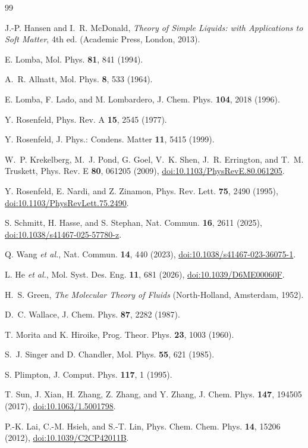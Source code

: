 \documentclass[aps,pre,twocolumn,superscriptaddress,floatfix]{revtex4-2}
\begin{document}
\begin{thebibliography}{99}

J.-P. Hansen and I.~R. McDonald,
\textit{Theory of Simple Liquids: with Applications to Soft Matter}, 4th ed.
(Academic Press, London, 2013).

E. Lomba,
Mol. Phys. \textbf{81}, 841 (1994).

A.~R. Allnatt,
Mol. Phys. \textbf{8}, 533 (1964).

E. Lomba, F. Lado, and M. Lombardero,
J. Chem. Phys. \textbf{104}, 2018 (1996).

Y. Rosenfeld,
Phys. Rev. A \textbf{15}, 2545 (1977).

Y. Rosenfeld,
J. Phys.: Condens. Matter \textbf{11}, 5415 (1999).

W.~P. Krekelberg, M.~J. Pond, G. Goel, V.~K. Shen, J.~R. Errington, and T.~M. Truskett,
Phys. Rev. E \textbf{80}, 061205 (2009),
\href{https://doi.org/10.1103/PhysRevE.80.061205}{doi:10.1103/PhysRevE.80.061205}.

Y. Rosenfeld, E. Nardi, and Z. Zinamon,
Phys. Rev. Lett. \textbf{75}, 2490 (1995),
\href{https://doi.org/10.1103/PhysRevLett.75.2490}{doi:10.1103/PhysRevLett.75.2490}.

S. Schmitt, H. Hasse, and S. Stephan,
Nat. Commun. \textbf{16}, 2611 (2025),
\href{https://doi.org/10.1038/s41467-025-57780-z}{doi:10.1038/s41467-025-57780-z}.

Q. Wang \textit{et al.},
Nat. Commun. \textbf{14}, 440 (2023),
\href{https://doi.org/10.1038/s41467-023-36075-1}{doi:10.1038/s41467-023-36075-1}.

L. He \textit{et al.},
Mol. Syst. Des. Eng. \textbf{11}, 681 (2026),
\href{https://doi.org/10.1039/D6ME00060F}{doi:10.1039/D6ME00060F}.

H.~S. Green,
\textit{The Molecular Theory of Fluids}
(North-Holland, Amsterdam, 1952).

D.~C. Wallace,
J. Chem. Phys. \textbf{87}, 2282 (1987).

T. Morita and K. Hiroike,
Prog. Theor. Phys. \textbf{23}, 1003 (1960).

S.~J. Singer and D. Chandler,
Mol. Phys. \textbf{55}, 621 (1985).

S. Plimpton,
J. Comput. Phys. \textbf{117}, 1 (1995).

T. Sun, J. Xian, H. Zhang, Z. Zhang, and Y. Zhang,
J. Chem. Phys. \textbf{147}, 194505 (2017),
\href{https://doi.org/10.1063/1.5001798}{doi:10.1063/1.5001798}.

P.-K. Lai, C.-M. Hsieh, and S.-T. Lin,
Phys. Chem. Chem. Phys. \textbf{14}, 15206 (2012),
\href{https://doi.org/10.1039/C2CP42011B}{doi:10.1039/C2CP42011B}.

\end{thebibliography}
\end{document}
